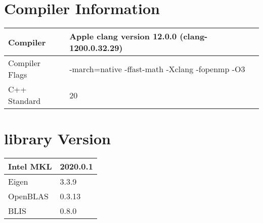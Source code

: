 \section{Compiler Information}
\begin{table}[htb]
    \centering
    \begin{tabular}{|l | l|}
        \hline
        Compiler & Apple clang version 12.0.0 (clang-1200.0.32.29) \\
        \hline
        Compiler Flags & -march=native -ffast-math -Xclang -fopenmp -O3 \\
        \hline
        C++ Standard & 20 \\
        \hline
    \end{tabular}
\end{table}

\section{library Version}
\begin{table}[htb]
    \centering
    \begin{tabular}{|l | l|}
        \hline
        Intel MKL & 2020.0.1 \\
        \hline
        Eigen & 3.3.9 \\
        \hline
        OpenBLAS & 0.3.13 \\
        \hline
        BLIS & 0.8.0 \\
        \hline
    \end{tabular}
\end{table}